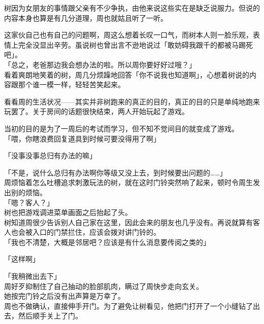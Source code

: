 树因为女朋友的事情跟父亲有不少争执，由他来说这些实在是缺乏说服力。但说的内容本身也算是有几分道理，周也就姑且听了一听。

这家伙自己也有自己的问题啊，周这么想着长叹一口气，而树本人则一脸乐观，表情上完全没显出辛劳。虽说树也曾出言不逊地说过「敢妨碍我跟千的都被马踢死吧」。\\

「总之，老爸那边我会想办法的啦。所以周你要好好过哦？」\\

看着爽朗地笑着的树，周几分烦躁地回答「你不说我也知道啊」，心想着树说的内容跟那个谁一模一样，轻轻苦笑起来。\\

\vspace{2\baselineskip}

看看周的生活状况——其实并非树跑来的真正的目的，真正的目的只是单纯地跑来玩罢了。关于房间的话题很快结束，两人开始玩起了游戏。

当初的目的是为了一周后的考试而学习，但不知不觉间目的就变成了游戏。\\

「喂，你瞎浪费回复道具到时候可要没得用了啊」

「没事没事总归有办法的嘛」

「不是，说什么总归有办法啊你等级又没上去，到时候要出问题的……」\\

周烦恼着怎么吐槽追求刺激玩法的树，就在这时门铃突然响了起来，顿时令周生发出别的烦恼。\\

「嗯？客人？」\\

树也把游戏调进菜单画面之后抬起了头。\\

树知道周很少告诉别人自己家在这里，因此会来的朋友也几乎没有。再说就算有客人也会被入口的门禁拦住，应该会拨对讲门铃的。\\

「我也不清楚，大概是邻居吧？应该是有什么消息要传阅之类的」

「这样啊」

「我稍微出去下」\\

周好歹抑制住了自己抽动的脸部肌肉，瞒过了周快步走向玄关。\\

她按完门铃之后没有出声算是万幸了。\\

周也不做确认，直接伸手开门。为了避免让树看见，他把门打开了一个小缝钻了出去，然后顺手关上了门。\\

